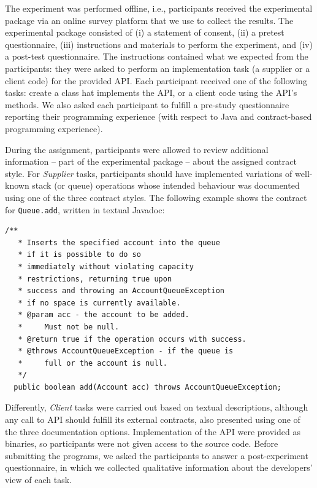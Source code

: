 The experiment was performed offline, i.e., participants received the experimental package via an online survey platform that we use to collect the results.
The experimental package consisted of (i) a statement of consent, (ii) a pretest
questionnaire, (iii) instructions and materials to perform the experiment, and (iv) a post-test questionnaire. 
The instructions contained what we expected from the participants: they were asked to perform an implementation task (a supplier or a client code) for the
provided API. Each participant received one of the following tasks: create a class hat implements the API, or a client code using the API's methods.
We also asked each participant to fulfill a pre-study questionnaire reporting their programming experience (with respect to Java and contract-based programming experience). 

During the assignment, participants were allowed to review additional information -- part of the experimental package -- about the assigned contract style. 
For \textit{Supplier} tasks, participants should have implemented variations of well-known stack (or queue) operations whose intended behaviour was documented using one of the three contract styles. The following example shows the contract for \lstinline!Queue.add!, written in textual Javadoc:

\begin{lstlisting}[basicstyle=\footnotesize\ttfamily,name=figxpi, frame=lines, mathescape=true]
/**
   * Inserts the specified account into the queue 
   * if it is possible to do so 
   * immediately without violating capacity 
   * restrictions, returning true upon 
   * success and throwing an AccountQueueException 
   * if no space is currently available.
   * @param acc - the account to be added. 
   *     Must not be null.
   * @return true if the operation occurs with success.
   * @throws AccountQueueException - if the queue is 
   *     full or the account is null.
   */
  public boolean add(Account acc) throws AccountQueueException;
\end{lstlisting}

Differently, \textit{Client} tasks were carried out based on textual descriptions, although any call to API should fulfill its external contracts, also presented using one of the three documentation options. Implementation of the API were provided as binaries, so participants were not given access to the source code.
Before submitting the programs, we asked the participants to answer a post-experiment questionnaire, in which we collected qualitative information about the developers' view of each task.

